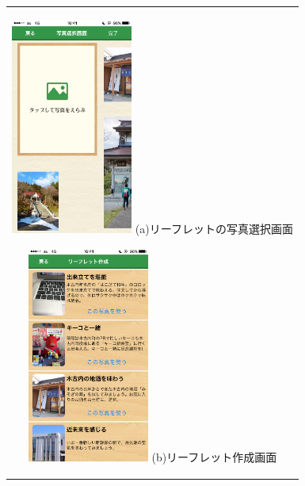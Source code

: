 \begin{figure}[htbp]
  \begin{center}
    \begin{tabular}{c}

      \begin{minipage}{0.33\hsize}
        \begin{center}
\includegraphics[width=4cm, bb=0 0 304 570]{kiko_print2.PNG}
          \hspace{1cm} (a)リーフレットの写真選択画面
        \end{center}
      \end{minipage}

      \begin{minipage}{0.33\hsize}
        \begin{center}
\includegraphics[width=4cm, bb=0 0 304 570]{kiko_print3.PNG}
          \hspace{1cm} (b)リーフレット作成画面
        \end{center}
      \end{minipage}
      
      \\
      

\end{tabular}
\end{center}
\end{figure}
